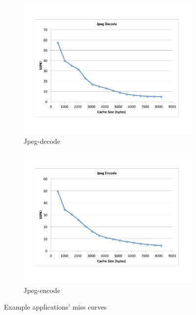 \documentclass{acm_proc_article-sp}
\begin{document}
\begin{figure}
        \begin{subfigure}[b]{0.25\textwidth}
          \includegraphics[width=\textwidth]{figs/jpeg-decode-miss-curve.pdf}
          \caption{Jpeg-decode}
          \label{fig:jpeg-decode}
        \end{subfigure}%
        \begin{subfigure}[b]{0.25\textwidth}
          \includegraphics[width=\textwidth]{figs/jpeg-encode-miss-curve.pdf}
          \caption{Jpeg-encode}
          \label{fig:jpeg-encode}
        \end{subfigure}
       \caption{Example applications' miss curves}
       \label{fig:miss-curve}
\end{figure}
\end{document}
